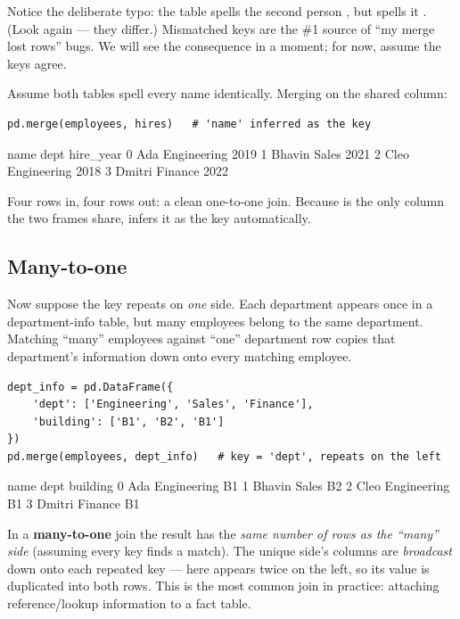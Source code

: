 \documentclass[11pt]{article}
\begin{document}
\begin{pyrefresh}
Notice the deliberate typo: the  table spells the second person , but  spells it . (Look again --- they differ.) Mismatched keys are the \#1 source of ``my merge lost rows'' bugs. We will see the consequence in a moment; for now, assume the keys agree.
\end{pyrefresh}

Assume both tables spell every name identically. Merging on the shared  column:

\begin{lstlisting}
pd.merge(employees, hires)   # 'name' inferred as the key
\end{lstlisting}

\begin{outblock}
     name         dept  hire_year
0     Ada  Engineering       2019
1  Bhavin        Sales       2021
2    Cleo  Engineering       2018
3  Dmitri      Finance       2022
\end{outblock}

Four rows in, four rows out: a clean one-to-one join. Because  is the only column the two frames share,  infers it as the key automatically.

\subsection{Many-to-one}

Now suppose the key repeats on \emph{one} side. Each department appears once in a department-info table, but many employees belong to the same department. Matching ``many'' employees against ``one'' department row copies that department's information down onto every matching employee.

\begin{lstlisting}
dept_info = pd.DataFrame({
    'dept': ['Engineering', 'Sales', 'Finance'],
    'building': ['B1', 'B2', 'B1']
})
pd.merge(employees, dept_info)   # key = 'dept', repeats on the left
\end{lstlisting}

\begin{outblock}
     name         dept building
0     Ada  Engineering       B1
1  Bhavin        Sales       B2
2    Cleo  Engineering       B1
3  Dmitri      Finance       B1
\end{outblock}

\begin{keyidea}
In a \textbf{many-to-one} join the result has the \emph{same number of rows as the ``many'' side} (assuming every key finds a match). The unique side's columns are \emph{broadcast} down onto each repeated key --- here  appears twice on the left, so its  value  is duplicated into both rows. This is the most common join in practice: attaching reference/lookup information to a fact table.
\end{keyidea}
\end{document}

